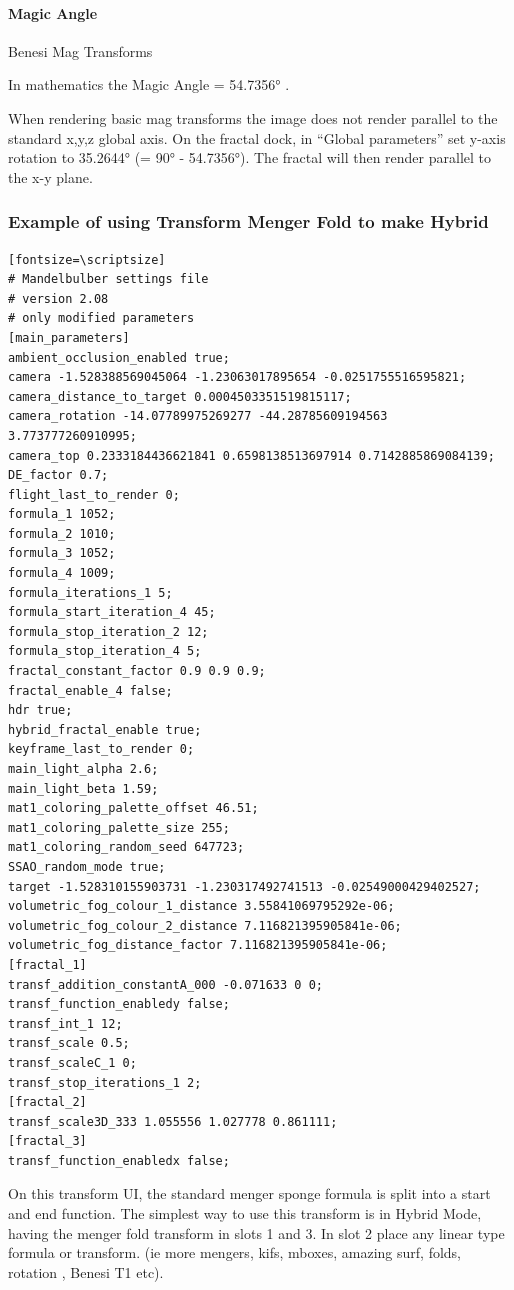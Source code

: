 \paragraph{Magic Angle} Benesi Mag Transforms

In mathematics the Magic Angle = 54.7356° .

When rendering basic mag transforms the image does not render parallel to the
standard x,y,z global axis. On the fractal dock, in ``Global parameters'' set
y-axis rotation to 35.2644° (= 90° - 54.7356°). The fractal will then render
parallel to the x-y plane.

\subsubsection{Example of using Transform Menger Fold to make
	Hybrid}\label{example-of-using-transfrom-mengerfold}

\begin{verbatim}[fontsize=\scriptsize]
# Mandelbulber settings file
# version 2.08
# only modified parameters
[main_parameters]
ambient_occlusion_enabled true;
camera -1.528388569045064 -1.23063017895654 -0.0251755516595821;
camera_distance_to_target 0.0004503351519815117;
camera_rotation -14.07789975269277 -44.28785609194563 3.773777260910995;
camera_top 0.2333184436621841 0.6598138513697914 0.7142885869084139;
DE_factor 0.7;
flight_last_to_render 0;
formula_1 1052;
formula_2 1010;
formula_3 1052;
formula_4 1009;
formula_iterations_1 5;
formula_start_iteration_4 45;
formula_stop_iteration_2 12;
formula_stop_iteration_4 5;
fractal_constant_factor 0.9 0.9 0.9;
fractal_enable_4 false;
hdr true;
hybrid_fractal_enable true;
keyframe_last_to_render 0;
main_light_alpha 2.6;
main_light_beta 1.59;
mat1_coloring_palette_offset 46.51;
mat1_coloring_palette_size 255;
mat1_coloring_random_seed 647723;
SSAO_random_mode true;
target -1.528310155903731 -1.230317492741513 -0.02549000429402527;
volumetric_fog_colour_1_distance 3.55841069795292e-06;
volumetric_fog_colour_2_distance 7.116821395905841e-06;
volumetric_fog_distance_factor 7.116821395905841e-06;
[fractal_1]
transf_addition_constantA_000 -0.071633 0 0;
transf_function_enabledy false;
transf_int_1 12;
transf_scale 0.5;
transf_scaleC_1 0;
transf_stop_iterations_1 2;
[fractal_2]
transf_scale3D_333 1.055556 1.027778 0.861111;
[fractal_3]
transf_function_enabledx false;
\end{verbatim}

On this transform UI, the standard menger sponge formula is split into a start
and end function. The simplest way to use this transform is in Hybrid Mode,
having the menger fold transform in slots 1 and 3. In slot 2 place any linear
type formula or transform. (ie more mengers, kifs, mboxes, amazing surf, folds,
rotation , Benesi T1 etc).

